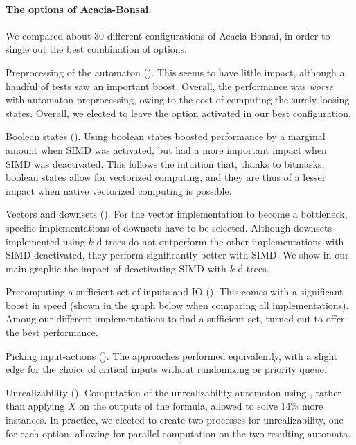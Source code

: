 \documentclass[runningheads,a4paper]{llncs}
\begin{document}
\paragraph{The options of Acacia-Bonsai.}  We compared about 30 different
configurations of Acacia-Bonsai, in order to single out the best combination of
options.  
\begin{compactitem}
\item Preprocessing of the automaton (). This seems to have
  little impact, although a handful of tests saw an important boost.  Overall,
  the performance was \emph{worse} with automaton preprocessing, owing to the
  cost of computing the surely loosing states.  Overall, we elected to leave the
  option activated in our best configuration.
\item Boolean states (). Using boolean states boosted
  performance by a marginal amount when SIMD was activated, but had a more
  important impact when SIMD was deactivated.  This follows the intuition that,
  thanks to bitmasks, boolean states allow for vectorized computing, and they
  are thus of a lesser impact when native vectorized computing is possible.
\item Vectors and downsets (). For the vector implementation to
  become a bottleneck, specific implementations of downsets have to be selected.
  Although downsets implemented using \(k\)-d trees do not outperform the other
  implementations with SIMD deactivated, they perform significantly better with
  SIMD.  We show in our main graphic the impact of deactivating SIMD with
  \(k\)-d trees.
\item Precomputing a sufficient set of inputs and IO ().  This
  comes with a significant boost in speed (shown in the graph below when
  comparing all implementations).  Among our different implementations to find a
  sufficient set,  turned out to offer the best
  performance.
\item Picking input-actions ().  The approaches performed
  equivalently, with a slight edge for the choice of critical inputs without
  randomizing or priority queue.
\item Unrealizability (). Computation of the unrealizability
  automaton using , rather than applying \(X\) on the
  outputs of the formula, allowed to solve 14\% more instances.  In practice, we
  elected to create two processes for unrealizability, one for each option,
  allowing for parallel computation on the two resulting automata.
\end{compactitem}
\end{document}

